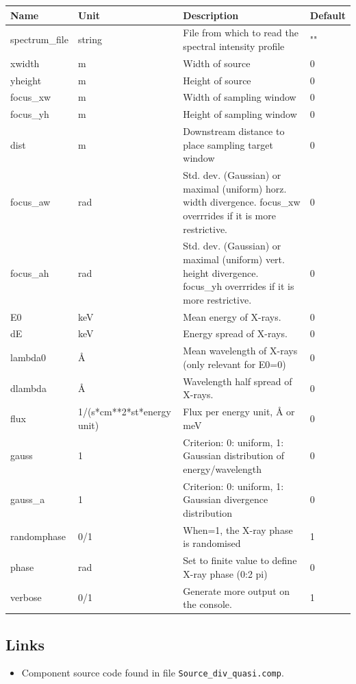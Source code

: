 \begin{longtable}{p{}p{}p{}p{}}
\toprule
\textbf{Name} & \textbf{Unit} & \textbf{Description} & \textbf{Default} \\
\midrule
\endhead
spectrum\_file & string & File from which to read the spectral intensity profile & "" \\
xwidth & m & Width of source & 0 \\
yheight & m & Height of source & 0 \\
focus\_xw & m & Width of sampling window & 0 \\
focus\_yh & m & Height of sampling window & 0 \\
dist & m & Downstream distance to place sampling target window & 0 \\
focus\_aw & rad & Std. dev. (Gaussian) or maximal (uniform) horz. width divergence. focus\_xw overrrides if it is more restrictive. & 0 \\
focus\_ah & rad & Std. dev. (Gaussian) or maximal (uniform) vert. height divergence. focus\_yh overrrides if it is more restrictive. & 0 \\
E0 & keV & Mean energy of X-rays. & 0 \\
dE & keV & Energy spread of X-rays. & 0 \\
lambda0 & \AA{} & Mean wavelength of X-rays (only relevant for E0=0) & 0 \\
dlambda & \AA{} & Wavelength half spread of X-rays. & 0 \\
flux & 1/(s*cm**2*st*energy unit) & Flux per energy unit, \AA{} or meV & 0 \\
gauss & 1 & Criterion: 0: uniform, 1: Gaussian distribution of energy/wavelength & 0 \\
gauss\_a & 1 & Criterion: 0: uniform, 1: Gaussian divergence distribution & 0 \\
randomphase & 0/1 & When=1, the X-ray phase is randomised & 1 \\
phase & rad & Set to finite value to define X-ray phase (0:2 pi) & 0 \\
verbose & 0/1 & Generate more output on the console. & 1 \\
\bottomrule
\end{longtable}

\subsection*{Links}
\begin{itemize}
  \item Component source code found in file \texttt{Source\_div\_quasi.comp}.
\end{itemize}
